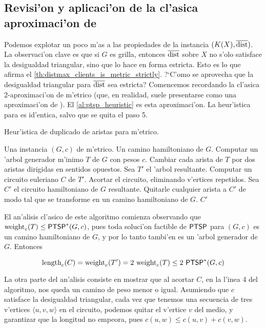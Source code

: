 \subsection{Revisi'on y aplicaci'on de la cl'asica aproximaci'on de }

Podemos explotar un poco m'as a las propiedades de la instancia $(K(X), \overline{\textnormal{dist}})$. La observaci'on clave es que si $G$ es grilla, entonces $\overline{\textnormal{dist}}$ sobre $X$ no s'olo satisface la desigualdad triangular, sino que lo hace en forma estricta. Esto es lo que afirma el \autoref{th:distmax_clients_is_metric_strictly}. ?`C'omo se aprovecha que la desigualdad triangular para $\overline{\textnormal{dist}}$ sea estricta? Comencemos recordando la cl'asica 2-aproximaci'on de  m'etrico \cite[p. 131]{Ga79} (que, en realidad, suele presentarse como una aproximaci'on de ). El \autoref{al:ptsp_heuristic} es esta aproximaci'on. La heur'istica para  es id'entica, salvo que se quita el paso 5.

\begin{algorithm}
  \caption{Heur'istica de duplicado de aristas para  m'etrico.}
  \label{al:ptsp_heuristic}
  \begin{algorithmic}[1]
  	\Require Una instancia $(G, c)$ de  m'etrico.
  	\Ensure Un camino hamiltoniano de $G$.
  	\State Computar un 'arbol generador m'inimo $T$ de $G$ con pesos $c$.
  	\State Cambiar cada arista de $T$ por dos aristas dirigidas en sentidos opuestos. Sea $T'$ el 'arbol resultante.
  	\State Computar un circuito euleriano $C$ de $T'$.
  	\State Acortar el circuito, eliminando v'ertices repetidos. Sea $C'$ el circuito hamiltoniano de $G$ resultante.
  	\State Quitarle cualquier arista a $C'$ de modo tal que se transforme en un camino hamiltoniano de $G$.
  	\Return $C'$
  \end{algorithmic}
\end{algorithm}

El an'alisis cl'asico de este algoritmo comienza observando que $\textnormal{weight}_c(T) \leq \textnormal{\textsf{PTSP}}^*(G, c)$, pues toda soluci'on factible de $\textnormal{\textsf{PTSP}}$ para $(G, c)$ es un camino hamiltoniano de $G$, y por lo tanto tambi'en es un 'arbol generador de $G$. Entonces

\[\textnormal{length}_c(C) = \textnormal{weight}_c(T') = 2 \text{ } \textnormal{weight}_c(T) \leq 2 \text{ }  \textnormal{\textsf{PTSP}}^*(G, c)\]

La otra parte del an'alisis consiste en mostrar que al acortar $C$, en la l'inea 4 del algoritmo, nos queda un camino de peso menor o igual. Asumiendo que $c$ satisface la desigualdad triangular, cada vez que tenemos una secuencia de tres v'ertices $\langle u, v, w \rangle$ en el circuito, podemos quitar el v'ertice $v$ del medio, y garantizar que la longitud no empeora, pues $c(u, w) \leq c(u, v) + c(v, w)$.

